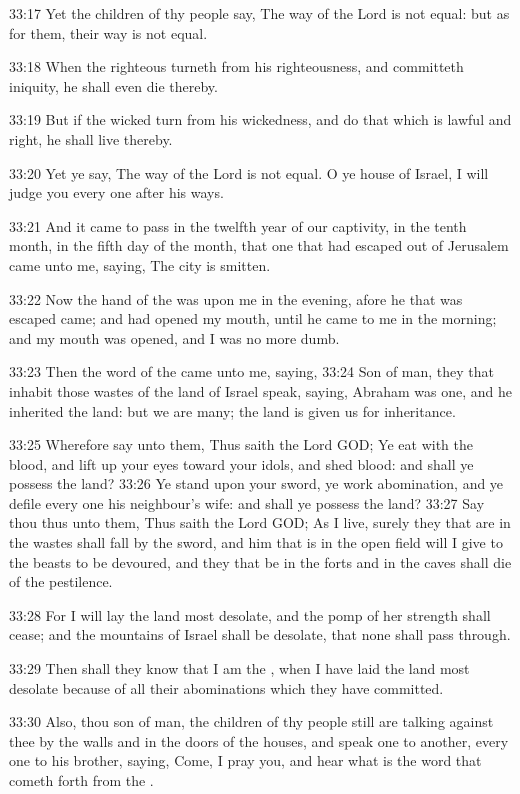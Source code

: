 33:17 Yet the children of thy people say, The way of the Lord is not equal: but as for them, their way is not equal.

33:18 When the righteous turneth from his righteousness, and committeth iniquity, he shall even die thereby.

33:19 But if the wicked turn from his wickedness, and do that which is lawful and right, he shall live thereby.

33:20 Yet ye say, The way of the Lord is not equal. O ye house of Israel, I will judge you every one after his ways.

33:21 And it came to pass in the twelfth year of our captivity, in the tenth month, in the fifth day of the month, that one that had escaped out of Jerusalem came unto me, saying, The city is smitten.

33:22 Now the hand of the \LORD was upon me in the evening, afore he that was escaped came; and had opened my mouth, until he came to me in the morning; and my mouth was opened, and I was no more dumb.

33:23 Then the word of the \LORD came unto me, saying, 33:24 Son of man, they that inhabit those wastes of the land of Israel speak, saying, Abraham was one, and he inherited the land: but we are many; the land is given us for inheritance.

33:25 Wherefore say unto them, Thus saith the Lord GOD; Ye eat with the blood, and lift up your eyes toward your idols, and shed blood: and shall ye possess the land?  33:26 Ye stand upon your sword, ye work abomination, and ye defile every one his neighbour's wife: and shall ye possess the land?  33:27 Say thou thus unto them, Thus saith the Lord GOD; As I live, surely they that are in the wastes shall fall by the sword, and him that is in the open field will I give to the beasts to be devoured, and they that be in the forts and in the caves shall die of the pestilence.

33:28 For I will lay the land most desolate, and the pomp of her strength shall cease; and the mountains of Israel shall be desolate, that none shall pass through.

33:29 Then shall they know that I am the \LORD, when I have laid the land most desolate because of all their abominations which they have committed.

33:30 Also, thou son of man, the children of thy people still are talking against thee by the walls and in the doors of the houses, and speak one to another, every one to his brother, saying, Come, I pray you, and hear what is the word that cometh forth from the \LORD.

